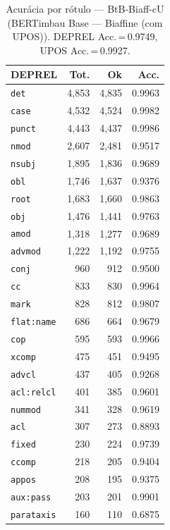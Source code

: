 \begin{table}[ht]
\centering
\caption{Acurácia por rótulo --- BtB-Biaff-cU (BERTimbau Base — Biaffine (com UPOS)). DEPREL Acc.\,=\,0.9749, UPOS Acc.\,=\,0.9927.}
\label{tab:acc-predict-test-df-bertimbau-base-biaffine}
\begin{minipage}[t]{0.55\linewidth}
\centering\scriptsize
\begin{tabular}{lrrr}
\toprule
\textbf{DEPREL} & \textbf{Tot.} & \textbf{Ok} & \textbf{Acc.} \\
\midrule
\texttt{det} & 4,853 & 4,835 & 0.9963 \\
\texttt{case} & 4,532 & 4,524 & 0.9982 \\
\texttt{punct} & 4,443 & 4,437 & 0.9986 \\
\texttt{nmod} & 2,607 & 2,481 & 0.9517 \\
\texttt{nsubj} & 1,895 & 1,836 & 0.9689 \\
\texttt{obl} & 1,746 & 1,637 & 0.9376 \\
\texttt{root} & 1,683 & 1,660 & 0.9863 \\
\texttt{obj} & 1,476 & 1,441 & 0.9763 \\
\texttt{amod} & 1,318 & 1,277 & 0.9689 \\
\texttt{advmod} & 1,222 & 1,192 & 0.9755 \\
\texttt{conj} & 960 & 912 & 0.9500 \\
\texttt{cc} & 833 & 830 & 0.9964 \\
\texttt{mark} & 828 & 812 & 0.9807 \\
\texttt{flat\!:\!name} & 686 & 664 & 0.9679 \\
\texttt{cop} & 595 & 593 & 0.9966 \\
\texttt{xcomp} & 475 & 451 & 0.9495 \\
\texttt{advcl} & 437 & 405 & 0.9268 \\
\texttt{acl\!:\!relcl} & 401 & 385 & 0.9601 \\
\texttt{nummod} & 341 & 328 & 0.9619 \\
\texttt{acl} & 307 & 273 & 0.8893 \\
\texttt{fixed} & 230 & 224 & 0.9739 \\
\texttt{ccomp} & 218 & 205 & 0.9404 \\
\texttt{appos} & 208 & 195 & 0.9375 \\
\texttt{aux\!:\!pass} & 203 & 201 & 0.9901 \\
\texttt{parataxis} & 160 & 110 & 0.6875 \\

\end{tabular}
\end{minipage}
\end{table}
